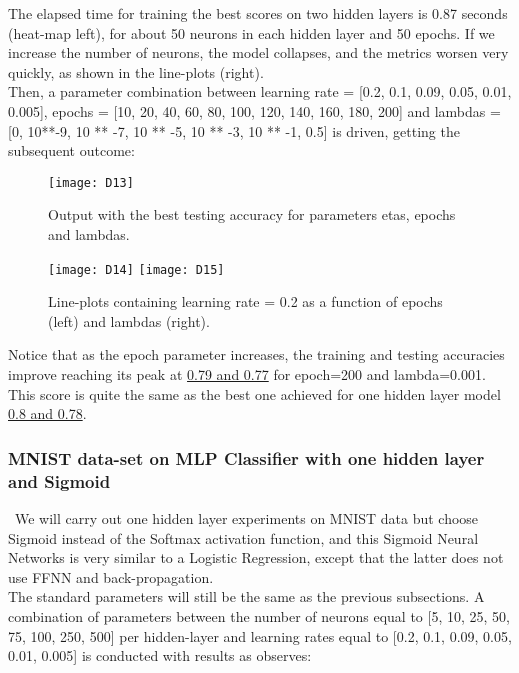 The elapsed time for training the best scores on two hidden layers is 0.87 seconds (heat-map left), for about 50 neurons in each hidden layer and 50 epochs. If we increase the number of neurons, the model collapses, and the metrics worsen very quickly, as shown in the line-plots (right).\\

Then, a parameter combination between learning rate = [0.2, 0.1, 0.09, 0.05, 0.01, 0.005], epochs = [10, 20, 40, 60, 80, 100, 120, 140, 160, 180, 200] and lambdas = [0, 10**-9, 10 ** -7, 10 ** -5, 10 ** -3, 10 ** -1, 0.5] is driven, getting the subsequent outcome:

\begin{figure}[H]
\label{fig:D8}
\centering
\texttt{[image: D13]}
\caption{Output with the best testing accuracy for parameters etas, epochs and lambdas.}
\end{figure}

\begin{figure}[H]
\label{fig:D9}
\centering
\texttt{[image: D14]}
\texttt{[image: D15]}
\caption{Line-plots containing learning rate = 0.2 as a function of epochs (left) and lambdas (right).}
\end{figure}

Notice that as the epoch parameter increases, the training and testing accuracies improve reaching its peak at \hyperref[fig:D8]{0.79 and 0.77} for epoch=200 and lambda=0.001. This score is quite the same as the best one achieved for one hidden layer model \hyperref[fig:D3]{0.8 and 0.78}.

\subsubsection{MNIST data-set on MLP Classifier with one hidden layer and Sigmoid}
\label{chap:MNIST data-set on MLP Classifier with one hidden layer and Sigmoid}

\quad \, We will carry out one hidden layer experiments on MNIST data but choose Sigmoid instead of the Softmax activation function, and this Sigmoid Neural Networks is very similar to a Logistic Regression, except that the latter does not use FFNN and back-propagation.\\

The standard parameters will still be the same as the previous subsections. A combination of parameters between the number of neurons equal to [5, 10, 25, 50, 75, 100, 250, 500] per hidden-layer and learning rates equal to [0.2, 0.1, 0.09, 0.05, 0.01, 0.005] is conducted with results as observes:

